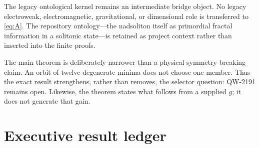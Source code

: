 \documentclass[11pt,a4paper]{article}
\begin{document}
The legacy ontological kernel remains an intermediate bridge object.  No legacy
electroweak, electromagnetic, gravitational, or dimensional role is transferred to
\eqref{eq:A}.  The repository ontology---the nadsoliton itself as primordial
fractal information in a solitonic state---is retained as project context rather
than inserted into the finite proofs.

The main theorem is deliberately narrower than a physical symmetry-breaking claim.
An orbit of twelve degenerate minima does not choose one member.  Thus the exact
result strengthens, rather than removes, the selector question: QW-2191 remains open.
Likewise, the theorem states what follows from a supplied $g$; it does not generate
that gain.

\section{Executive result ledger}
\small
\end{document}
